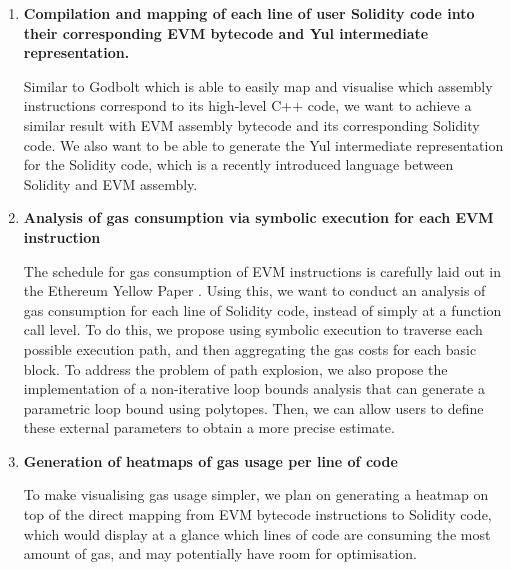 \begin{enumerate}
    \item \textbf{Compilation and mapping of each line of user Solidity code into their corresponding EVM bytecode and Yul intermediate representation.}
    
      Similar to Godbolt which is able to easily map and visualise which assembly
      instructions correspond to its high-level C++ code, we want to achieve a
      similar result with EVM assembly bytecode and its corresponding Solidity code.
      We also want to be able to generate the Yul intermediate representation for
      the Solidity code, which is a recently introduced language between Solidity
      and EVM assembly.
    \item \textbf{Analysis of gas consumption via symbolic execution for each EVM instruction}
    
      The schedule for gas consumption of EVM instructions is carefully laid out 
      in the Ethereum Yellow Paper \cite{ethereumyellowpaper}. Using this,
      we want to conduct an analysis of gas consumption for each line
      of Solidity code, instead of simply at a function call level. To do this, we 
      propose using symbolic execution to traverse each possible execution path, 
      and then aggregating the gas costs for each basic block. 
      To address the problem of path explosion, we also propose the implementation of a
      non-iterative loop bounds analysis that can generate a parametric loop bound using
      polytopes. Then, we can allow users to define these external parameters to obtain a 
      more precise estimate.

    \item \textbf{Generation of heatmaps of gas usage per line of code}
    
      To make visualising gas usage simpler, we plan on generating a heatmap on top of
      the direct mapping from EVM bytecode instructions to Solidity code, which would 
      display at a glance which lines of code are consuming the most amount of gas, and 
      may potentially have room for optimisation.

      
      
\end{enumerate}


